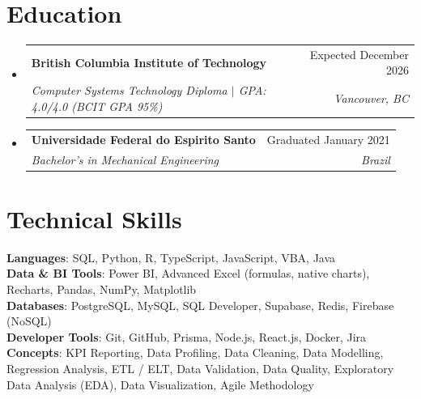 \documentclass[letterpaper,11pt]{article}
\makeatletter
\newcommand{\resumeSubheading}[4]{
  \vspace{-2pt}\item
    \begin{tabular*}{0.97\textwidth}[t]{l@{\extracolsep{\fill}}r}
      \textbf{#1} & #2 \\
      \textit{\small#3} & \textit{\small #4} \\
    \end{tabular*}\vspace{-7pt}
}
\newcommand{\resumeSubHeadingListStart}{\begin{itemize}[leftmargin=0.15in, label={}]}
\newcommand{\resumeSubHeadingListEnd}{\end{itemize}}
\makeatother
\begin{document}
\section{Education}
  \resumeSubHeadingListStart
    \resumeSubheading
      {British Columbia Institute of Technology}{Expected December 2026}
      {Computer Systems Technology Diploma $|$ \textup{GPA: 4.0/4.0 (BCIT GPA 95\%)}}{Vancouver, BC}
    \resumeSubheading
      {Universidade Federal do Espirito Santo}{Graduated January 2021}
      {Bachelor's in Mechanical Engineering}{Brazil}
  \resumeSubHeadingListEnd


%
\section{Technical Skills}
 \begin{itemize}[leftmargin=0.15in, label={}]
    \small{\item{

     \textbf{Languages}{: SQL, Python, R, TypeScript, JavaScript, VBA, Java} \\

     \textbf{Data \& BI Tools}{: Power BI, Advanced Excel (formulas, native charts), Recharts, Pandas, NumPy, Matplotlib} \\

     \textbf{Databases}{: PostgreSQL, MySQL, SQL Developer, Supabase, Redis, Firebase (NoSQL)} \\

     \textbf{Developer Tools}{: Git, GitHub, Prisma, Node.js, React.js, Docker, Jira} \\

     \textbf{Concepts}{: KPI Reporting, Data Profiling, Data Cleaning, Data Modelling, Regression Analysis, ETL / ELT, Data Validation, Data Quality, Exploratory Data Analysis (EDA), Data Visualization, Agile Methodology}

    }}
 \end{itemize}


\end{document}
